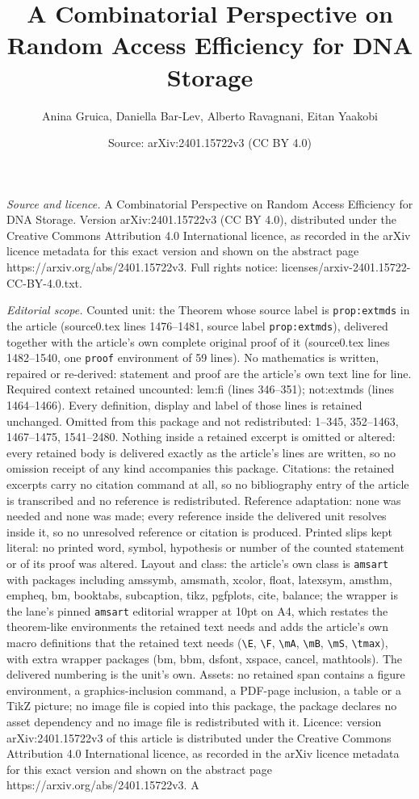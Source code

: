 \documentclass[10pt,a4paper]{amsart}
\title[A Combinatorial Perspective on Random Access Efficiency for ]{A Combinatorial Perspective on Random Access Efficiency for DNA Storage}
\author{Anina Gruica, Daniella Bar-Lev, Alberto Ravagnani, Eitan Yaakobi}
\date{Source: arXiv:2401.15722v3 (CC BY 4.0)}
\begin{document}
\maketitle

\noindent\emph{Source and licence.} A Combinatorial Perspective on Random Access Efficiency for DNA Storage. Version arXiv:2401.15722v3 (CC BY 4.0), distributed under the Creative Commons Attribution 4.0 International licence, as recorded in the arXiv licence metadata for this exact version and shown on the abstract page https://arxiv.org/abs/2401.15722v3. Full rights notice: licenses/arxiv-2401.15722-CC-BY-4.0.txt.\par\smallskip

\noindent\textit{Editorial scope.} Counted unit: the Theorem whose source label is \texttt{prop:extmds} in the article (source0.tex lines 1476--1481, source label \texttt{prop:extmds}), delivered together with the article's own complete original proof of it (source0.tex lines 1482--1540, one \texttt{proof} environment of 59 lines). No mathematics is written, repaired or re-derived: statement and proof are the article's own text line for line. Required context retained uncounted: lem:fi (lines 346--351); not:extmds (lines 1464--1466). Every definition, display and label of those lines is retained unchanged. Omitted from this package and not redistributed: 1--345, 352--1463, 1467--1475, 1541--2480. Nothing inside a retained excerpt is omitted or altered: every retained body is delivered exactly as the article's lines are written, so no omission receipt of any kind accompanies this package. Citations: the retained excerpts carry no citation command at all, so no bibliography entry of the article is transcribed and no reference is redistributed. Reference adaptation: none was needed and none was made; every reference inside the delivered unit resolves inside it, so no unresolved reference or citation is produced. Printed slips kept literal: no printed word, symbol, hypothesis or number of the counted statement or of its proof was altered. Layout and class: the article's own class is \texttt{amsart} with packages including amssymb, amsmath, xcolor, float, latexsym, amsthm, empheq, bm, booktabs, subcaption, tikz, pgfplots, cite, balance; the wrapper is the lane's pinned \texttt{amsart} editorial wrapper at 10pt on A4, which restates the theorem-like environments the retained text needs and adds the article's own macro definitions that the retained text needs (\texttt{\textbackslash E}, \texttt{\textbackslash F}, \texttt{\textbackslash mA}, \texttt{\textbackslash mB}, \texttt{\textbackslash mS}, \texttt{\textbackslash tmax}), with extra wrapper packages (bm, bbm, dsfont, xspace, cancel, mathtools). The delivered numbering is the unit's own. Assets: no retained span contains a figure environment, a graphics-inclusion command, a PDF-page inclusion, a table or a TikZ picture; no image file is copied into this package, the package declares no asset dependency and no image file is redistributed with it. Licence: version arXiv:2401.15722v3 of this article is distributed under the Creative Commons Attribution 4.0 International licence, as recorded in the arXiv licence metadata for this exact version and shown on the abstract page https://arxiv.org/abs/2401.15722v3. A 
\end{document}
